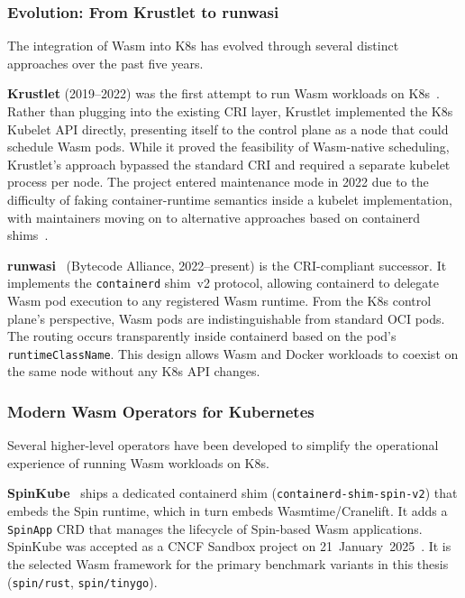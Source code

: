 \subsubsection{Evolution: From Krustlet to runwasi}

The integration of \acs{Wasm} into \acs{K8s} has evolved through several distinct approaches over the past five years.

\textbf{Krustlet} (2019--2022) was the first attempt to run \acs{Wasm} workloads on \acs{K8s}~\cite{squillace2020krustlet}. Rather than plugging into the existing \acs{CRI} layer, Krustlet implemented the \acs{K8s} Kubelet \acs{API} directly, presenting itself to the control plane as a node that could schedule \acs{Wasm} pods. While it proved the feasibility of \acs{Wasm}-native scheduling, Krustlet's approach bypassed the standard \acs{CRI} and required a separate kubelet process per node. The project entered maintenance mode in 2022 due to the difficulty of faking container-runtime semantics inside a kubelet implementation, with maintainers moving on to alternative approaches based on containerd shims~\cite{krustlet2024archive}.

\begin{sloppypar}
\textbf{runwasi}~\cite{runwasi2024} (Bytecode Alliance, 2022--present) is the \acs{CRI}-compliant successor. It implements the \texttt{containerd} shim~v2 protocol, allowing containerd to delegate \acs{Wasm} pod execution to any registered \acs{Wasm} runtime. From the \acs{K8s} control plane's perspective, \acs{Wasm} pods are indistinguishable from standard \acs{OCI} pods. The routing occurs transparently inside containerd based on the pod's \texttt{runtimeClassName}. This design allows \acs{Wasm} and Docker workloads to coexist on the same node without any \acs{K8s} \acs{API} changes.
\end{sloppypar}

\subsubsection{Modern Wasm Operators for Kubernetes}

Several higher-level operators have been developed to simplify the operational experience of running \acs{Wasm} workloads on \acs{K8s}.

\begin{sloppypar}
\textbf{SpinKube}~\cite{spinkube2024} ships a dedicated containerd shim (\texttt{containerd-shim-spin-v2}) that embeds the Spin runtime, which in turn embeds Wasmtime/Cranelift. It adds a \texttt{SpinApp} \acs{CRD} that manages the lifecycle of Spin-based \acs{Wasm} applications. SpinKube was accepted as a \acs{CNCF} Sandbox project on 21~January~2025~\cite{cncf2025spinkube}. It is the selected \acs{Wasm} framework for the primary benchmark variants in this thesis (\texttt{spin/rust}, \texttt{spin/tinygo}).
\end{sloppypar}


